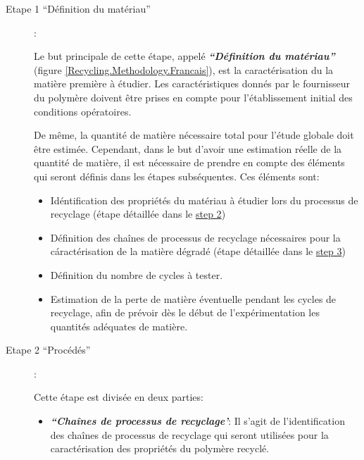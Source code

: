 \begin{description}
	\item[Etape 1 ``Définition du matériau'']:
	
	Le but principale de cette étape, appelé \textit{\textbf{``Définition du matériau''}}  (figure \ref{Recycling.Methodology.Francais}),   est la caractérisation du la matière première à étudier.
	Les caractéristiques donnés par le fournisseur du polymère doivent être prises en compte pour l'établissement initial des conditions opératoires. 
	
	De même, la quantité de matière nécessaire total pour l'étude globale doit être estimée.
	Cependant, dans le but d'avoir une estimation réelle de la quantité de matière, il est nécessaire de prendre en compte des éléments qui seront définis dans les étapes subséquentes.
	Ces éléments sont:
	
	\begin{itemize}[noitemsep]
		
		\item Idéntification des propriétés du matériau à étudier lors du processus de recyclage (étape détaillée dans le \hyperlink{Step2}{step 2})
		
		\item Définition des chaînes de processus de recyclage nécessaires pour la cáractérisation de la matière dégradé  (étape détaillée dans le \hyperlink{Step3}{step 3})
		
		\item Définition du nombre de cycles à tester.
		
		\item Estimation de la perte de matière éventuelle pendant les cycles de recyclage, afin de prévoir dès le début de l'expérimentation les quantités adéquates de matière. 
		
		
		
	\end{itemize}
	
	
	\item[ \hypertarget{Step2}{Etape 2 ``Procédés''}]: 
	
	
	Cette étape est divisée en deux parties:
	
	\begin{itemize}[noitemsep]
		\item 	\textbf{\textit{``Chaînes de processus de recyclage'}}: Il s'agit de l'identification des chaînes de processus de recyclage qui seront utilisées pour la caractérisation des propriétés du polymère recyclé.
		

\end{itemize}
\end{description}
